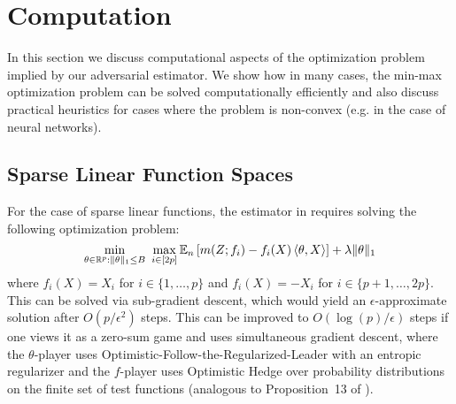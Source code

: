 \section{Computation}\label{sec:computation}

In this section we discuss computational aspects of the optimization problem implied by our adversarial estimator. We show how in many cases, the min-max optimization problem can be solved computationally efficiently and also discuss practical heuristics for cases where the problem is non-convex (e.g. in the case of neural networks).

\subsection{Sparse Linear Function Spaces}

For the case of sparse linear functions, the estimator in  requires solving the following optimization problem:
\begin{equation}\label{eqn:minimax-ell1}
    \min_{\theta\in \mathbb{R}^p: \|\theta\|_1\leq B}\,\, \max_{i\in [2p]} \mathbb{E}_n\left[m(Z; f_i) - f_i(X)\, \langle \theta, X \rangle \right] + \lambda \|\theta\|_1
\end{equation}
where $f_i(X) = X_i$ for $i\in \{1, \ldots, p\}$ and $f_i(X)=-X_i$ for $i\in \{p+1, \ldots, 2p\}$.
This can be solved via sub-gradient descent, which would yield an $\epsilon$-approximate solution after $O\left(p/\epsilon^2\right)$ steps. This can be improved to $O\left(\log(p)/\epsilon\right)$ steps if one views it as a zero-sum game and uses simultaneous gradient descent, where the $\theta$-player uses Optimistic-Follow-the-Regularized-Leader with an entropic regularizer and the $f$-player uses Optimistic Hedge over probability distributions on the finite set of test functions (analogous to Proposition~13 of \cite{dikkala2020minimax}).

